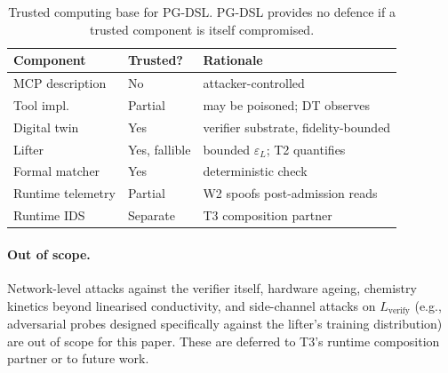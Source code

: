 \begin{table}[t]
\centering
\footnotesize
\caption{Trusted computing base for PG-DSL. PG-DSL provides no
defence if a trusted component is itself compromised.}
\label{tbl:tcb}
\begin{tabular}{@{}p{}p{}p{}@{}}
\toprule
Component & Trusted? & Rationale \\
\midrule
MCP description & No & attacker-controlled \\
Tool impl. & Partial & may be poisoned; DT observes \\
Digital twin & Yes & verifier substrate, fidelity-bounded \\
Lifter & Yes, fallible & bounded $\varepsilon_L$; T2 quantifies \\
Formal matcher & Yes & deterministic check \\
Runtime telemetry & Partial & W2 spoofs post-admission reads \\
Runtime IDS & Separate & T3 composition partner \\
\bottomrule
\end{tabular}
\end{table}

\paragraph{Out of scope.}
Network-level attacks against the verifier itself, hardware ageing,
chemistry kinetics beyond linearised conductivity, and side-channel
attacks on $L_{\text{verify}}$ (e.g., adversarial probes designed
specifically against the lifter's training distribution) are out of
scope for this paper. These are deferred to T3's runtime composition
partner or to future work.

